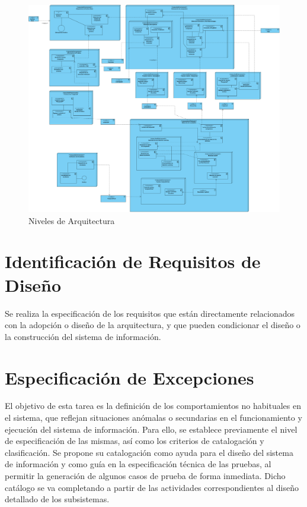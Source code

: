 \begin{figure}[H]
    \centering
    \includegraphics[scale=0.25]{Capitulo3/images/Niveles_de_Arquitectura.png}
    \caption{Niveles de Arquitectura}
    \label{arquitectura_N}
\end{figure}
\newpage

\section{Identificación de Requisitos de Diseño}
\noindent Se realiza la especificación de los requisitos que están directamente relacionados con la adopción o diseño de la arquitectura, y que pueden condicionar el diseño o la construcción del sistema de información.


\newpage
\section{Especificación de Excepciones}
\noindent El objetivo de esta tarea es la definición de los comportamientos no habituales en el
sistema, que reflejan situaciones anómalas o secundarias en el funcionamiento y ejecución del
sistema de información. Para ello, se establece previamente el nivel de especificación de las
mismas, así como los criterios de catalogación y clasificación.
Se propone su catalogación como ayuda para el diseño del sistema de información y
como guía en la especificación técnica de las pruebas, al permitir la generación de algunos
casos de prueba de forma inmediata. Dicho catálogo se va completando a partir de las
actividades correspondientes al diseño detallado de los subsistemas.\\

